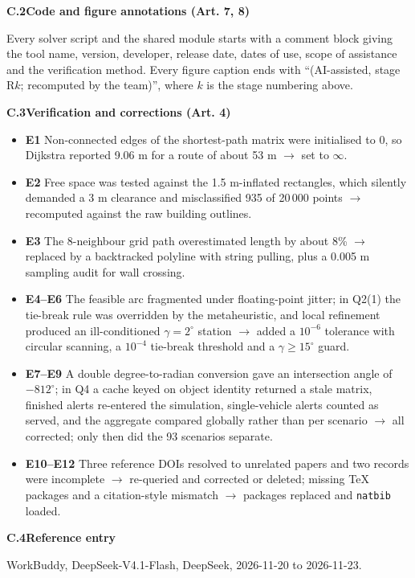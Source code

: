 {\vspace{3pt}
\noindent\textbf{C.2\quad Code and figure annotations (Art. 7, 8)}

Every solver script and the shared module starts with a comment block giving the tool name, version, developer, release date, dates of use, scope of assistance and the verification method. Every figure caption ends with ``(AI-assisted, stage R$k$; recomputed by the team)'', where $k$ is the stage numbering above.

\vspace{3pt}
\noindent\textbf{C.3\quad Verification and corrections (Art. 4)}

\begin{itemize}[leftmargin=1.5em]
  \item \textbf{E1} Non-connected edges of the shortest-path matrix were initialised to $0$, so Dijkstra reported 9.06 m for a route of about 53 m $\rightarrow$ set to $\infty$.
  \item \textbf{E2} Free space was tested against the 1.5 m-inflated rectangles, which silently demanded a 3 m clearance and misclassified 935 of 20\,000 points $\rightarrow$ recomputed against the raw building outlines.
  \item \textbf{E3} The 8-neighbour grid path overestimated length by about 8\% $\rightarrow$ replaced by a backtracked polyline with string pulling, plus a 0.005 m sampling audit for wall crossing.
  \item \textbf{E4--E6} The feasible arc fragmented under floating-point jitter; in Q2(1) the tie-break rule was overridden by the metaheuristic, and local refinement produced an ill-conditioned $\gamma=2^\circ$ station $\rightarrow$ added a $10^{-6}$ tolerance with circular scanning, a $10^{-4}$ tie-break threshold and a $\gamma\ge15^\circ$ guard.
  \item \textbf{E7--E9} A double degree-to-radian conversion gave an intersection angle of $-812^\circ$; in Q4 a cache keyed on object identity returned a stale matrix, finished alerts re-entered the simulation, single-vehicle alerts counted as served, and the aggregate compared globally rather than per scenario $\rightarrow$ all corrected; only then did the 93 scenarios separate.
  \item \textbf{E10--E12} Three reference DOIs resolved to unrelated papers and two records were incomplete $\rightarrow$ re-queried and corrected or deleted; missing \TeX{} packages and a citation-style mismatch $\rightarrow$ packages replaced and \texttt{natbib} loaded.
\end{itemize}

\vspace{3pt}
\noindent\textbf{C.4\quad Reference entry}

\noindent [13] WorkBuddy, DeepSeek-V4.1-Flash, DeepSeek, 2026-11-20 to 2026-11-23.
\par}
